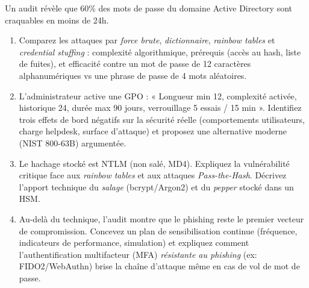 \documentclass[11pt]{article}
\begin{document}
\begin{exercice}
Un audit révèle que 60\% des mots de passe du domaine Active Directory sont craquables en moins de 24h.
\begin{enumerate}
    \item Comparez les attaques par \textit{force brute}, \textit{dictionnaire}, \textit{rainbow tables} et \textit{credential stuffing} : complexité algorithmique, prérequis (accès au hash, liste de fuites), et efficacité contre un mot de passe de 12 caractères alphanumériques vs une phrase de passe de 4 mots aléatoires.
    \item L'administrateur active une GPO : « Longueur min 12, complexité activée, historique 24, durée max 90 jours, verrouillage 5 essais / 15 min ». Identifiez trois effets de bord négatifs sur la sécurité réelle (comportements utilisateurs, charge helpdesk, surface d'attaque) et proposez une alternative moderne (NIST 800-63B) argumentée.
    \item Le hachage stocké est NTLM (non salé, MD4). Expliquez la vulnérabilité critique face aux \textit{rainbow tables} et aux attaques \textit{Pass-the-Hash}. Décrivez l'apport technique du \textit{salage} (bcrypt/Argon2) et du \textit{pepper} stocké dans un HSM.
    \item Au-delà du technique, l'audit montre que le phishing reste le premier vecteur de compromission. Concevez un plan de sensibilisation continue (fréquence, indicateurs de performance, simulation) et expliquez comment l'authentification multifacteur (MFA) \textit{résistante au phishing} (ex: FIDO2/WebAuthn) brise la chaîne d'attaque même en cas de vol de mot de passe.
\end{enumerate}
\end{exercice}
\end{document}
